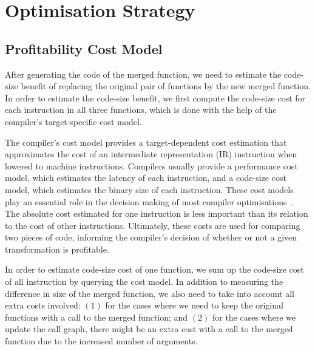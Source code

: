 
\chapter{Optimisation Strategy}

\section{Profitability Cost Model}\label{sec:profit-model}

After generating the code of the merged function, we need to estimate the code-size benefit of replacing the original pair of functions by the new merged function.
In order to estimate the code-size benefit, we first compute the code-size cost for each instruction in all three functions, which is done with the help of the compiler's target-specific cost model.


The compiler's cost model provides a target-dependent cost estimation that approximates the cost of an intermediate representation (IR) instruction when lowered to machine instructions.
Compilers usually provide a performance cost model, which estimates the latency of each instruction, and a code-size cost model, which estimates the binary size of each instruction.
These cost models play an essential role in the decision making of most compiler optimisations~\cite{porpodas18b,pohl18}.
The absolute cost estimated for one instruction is less important than its relation to the cost of other instructions.
Ultimately, these costs are used for comparing two pieces of code, informing the compiler's decision of whether or not a given transformation is profitable.

In order to estimate code-size cost of one function, we sum up the code-size cost of all instruction by querying the cost model.
In addition to measuring the difference in size of the merged function, we also need to take into account all extra costs involved:
$(1)$ for the cases where we need to keep the original functions with a call to the merged function;
and $(2)$ for the cases where we update the call graph, there might be an extra cost with a call to the merged function due to the increased number of arguments.

